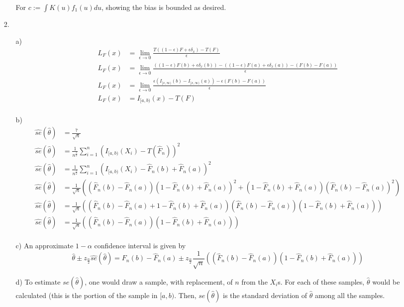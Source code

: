 \documentclass[11pt]{article}
\theoremstyle{definition}
\begin{document}
\begin{itemize}
\begin{itemize}
                For \(c:=\int K(u) f_1(u) du\), showing the bias is bounded as desired.
        \end{itemize}
    \item[2.]
        \begin{itemize}
            \item[a)]
                \begin{align*}
                    L_F(x)&=\lim_{\epsilon\to 0} \frac{T((1-\epsilon)F+\epsilon\delta_x)-T(F)}{\epsilon} \\
                    L_F(x)&=\lim_{\epsilon\to 0} \frac{((1-\epsilon)F(b)+\epsilon\delta_x(b))-((1-\epsilon)F(a)+\epsilon\delta_x(a))-(F(b)-F(a))}{\epsilon} \\
                    L_F(x)&=\lim_{\epsilon\to 0} \frac{\epsilon(I_{[x,\infty)}(b)-I_{[x,\infty)}(a))-\epsilon (F(b)-F(a))}{\epsilon} \\
                    L_F(x)&= I_{[a,b)}(x)-T(F) \\
                \end{align*}
            \item[b)]
                \begin{align*}
                    \hat{se}(\hat \theta) &= \frac{\hat \tau}{\sqrt{n}} \\
                    \hat{se}(\hat \theta) &= \frac{1}{n^\frac{3}{2}}\sum_{i=1}^n(I_{[a,b)}(X_i)-T(\hat F_n))^2 \\
                    \hat{se}(\hat \theta) &= \frac{1}{n^\frac{3}{2}}\sum_{i=1}^n(I_{[a,b)}(X_i)-\hat F_n(b)+\hat F_n(a))^2 \\
                    \hat{se}(\hat \theta) &= \frac{1}{\sqrt{n}}\left((\hat F_n(b)-\hat F_n(a))(1-\hat F_n(b)+\hat F_n(a))^2+(1-\hat F_n(b)+\hat F_n(a))(\hat F_n(b)-\hat F_n(a))^2\right) \\
                    \hat{se}(\hat \theta) &= \frac{1}{\sqrt{n}}\left((\hat F_n(b)-\hat F_n(a)+1- \hat F_n(b)+\hat F_n(a))(\hat F_n(b)-\hat F_n(a))(1-\hat F_n(b)+\hat F_n(a))\right) \\
                    \hat{se}(\hat \theta) &= \frac{1}{\sqrt{n}}\left((\hat F_n(b)-\hat F_n(a))(1-\hat F_n(b)+\hat F_n(a))\right) \\
                \end{align*}
            \item[c)]
                An approximate \(1-\alpha\) confidence interval is given by 
                \[\hat \theta \pm z_{\frac{\alpha}{2}}\hat{se}(\hat \theta) = F_n(b)-\hat F_n(a) \pm z_{\frac{\alpha}{2}}\frac{1}{\sqrt{n}}\left((\hat F_n(b)-\hat F_n(a))(1-\hat F_n(b)+\hat F_n(a))\right)\]
            \item[d)]
                To estimate \(se(\hat \theta)\), one would draw a sample, with replacement, of $n$ from the $X_i$s. For each of these samples, $\hat\theta$ would be calculated (this is the portion of the sample in \([a,b)\). Then, \(se(\hat \theta)\) is the standard deviation of $\hat\theta$ among all the samples.

        \end{itemize}
\end{itemize}
\end{document}
